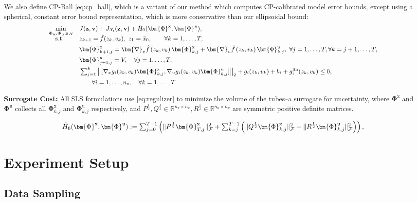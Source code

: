 \documentclass{l4dc2026}
\newcommand{\defeq}{:=}
\newcommand{\Z}{\mathbf{z}}
\newcommand{\V}{\mathbf{v}}
\newcommand{\Qf}{P}
\newcommand{\Px}{\bm{\Phi}^{\mathrm{x}}}
\newcommand{\Pu}{\bm{\Phi}^{\mathrm{u}}}
\newcommand{\F}{\mathcal{F}}
\begin{document}
We also define CP-Ball \eqref{eq:cp_ball}, which is a variant of our method which computes CP-calibrated model error bounds, except using a spherical, constant error bound representation, which is more conservative than our ellipsoidal bound:
\begin{subequations}\small
\label{eq:cp_ball}
\begin{align}
\min_{\substack{\mathbf{\Phi}_{\mathbf{x}},\mathbf{\Phi}_{\mathrm{u}},\mathbf{z}, \mathbf{v}}}\quad &  J(\mathbf{z},\mathbf{v})  + J_{\mathcal{X}_\textrm{f}}(\Z,\V) +  \tilde H_0(\Px, \Pu),\\[-6pt]
\text { s.t. }\quad\quad &  {z}_{k+1}= \hat{f}(z_k,v_k),~ {z}_1 = \bar x_0,\quad\quad \forall k = 1,\ldots, T,\\
&\Px_{k+1,j} =\bm{\nabla}_x \hat{f}\left(z_k, v_k\right)  \Px_{k,j} + \bm{\nabla}_u \hat{f}\left(z_k, v_k\right) \Pu_{k,j},\ \forall j = 1,\ldots, T, \forall k = j+1,\ldots,T,\\
&\Px_{j+1,j} = V,\quad \forall j = 1,\ldots, T,\\%
& \textstyle\sum_{j=1}^{k}\big\Vert[\nabla_xg_{i}(z_k,v_k)\Px_{k,j}, \nabla_ug_{i}(z_k,v_k)\Pu_{k,j}]\big\Vert_{2} + g_{i}(z_k,v_k) + b_{i} + g_i^\textrm{lin}(z_k,v_k)  \leq 0,\\
&  \quad\quad \forall i =1, \ldots, n_c,\quad \forall k= 1,\ldots,T. \nonumber
\end{align}
\end{subequations}

\noindent\textbf{Surrogate Cost:} All SLS formulations use \eqref{eq:regulizer} to minimize the volume of the tubes--a surrogate for uncertainty, where $\Px$ and $\Pu$ collects all $\Px_{k,j}$ and $\Pu_{k,j}$ respectively, and $P^{\frac{1}{2}}, Q^{\frac{1}{2}} \in \mathbb{R}^{n_x \times n_x}, R^{\frac{1}{2}}\in\mathbb{R}^{n_u \times n_u}$ are symmetric positive definite matrices.

\begin{equation}  \label{eq:regulizer}\small 
\tilde H_0(\Px,\Pu)\defeq 
\textstyle\sum_{j=0}^{T-1} \left( \|\Qf^{\frac{1}{2}} \Px_{T,j}\|_\F^2  + \sum_{k=j}^{T-1}  \left(\| Q^{\frac{1}{2}} \Px_{k,j}\|_\F^2+ \| R^{\frac{1}{2}} \Pu_{k,j}\|_\F^2 \right)\right),
\end{equation}


\section{Experiment Setup}\label{app:training}
\subsection{Data Sampling}\label{app:exp_data}
\end{document}
